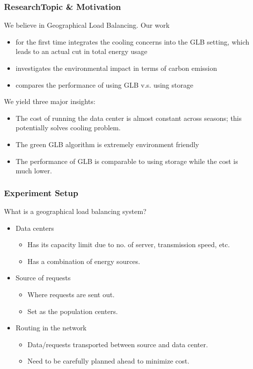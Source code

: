 \documentclass{beamer}
\begin{document}
%
%
\begin{frame}
\frametitle{ResearchTopic \& Motivation}
\begin{block}
{We believe in Geographical Load Balancing.}
Our work 
\begin{itemize}
\item
for the first time integrates the cooling concerns into the GLB setting, which leads to an actual cut in total energy usage
\item
investigates the environmental impact in terms of carbon emission
\item
compares the performance of using GLB v.s. using storage
\end{itemize}
We yield three major insights:
\begin{itemize}
\item
The cost of running the data center is almost constant across seasons; this potentially solves cooling problem.
\item
The green GLB algorithm is extremely environment friendly
\item
The performance of GLB is comparable to using storage while the cost is much lower.
\end{itemize}
\end{block}
\end{frame}
%
%
\begin{frame}
\frametitle{Experiment Setup}
\begin{block}
{What is a geographical load balancing system?}
\begin{itemize}
\item
Data centers
	\begin{itemize}
	\item
	Has its capacity limit due to no. of server, transmission speed, etc.
	\item
	Has a combination of energy sources.
	\end{itemize}
\item
Source of requests
	\begin{itemize}
	\item
	Where requests are sent out.
	\item
	Set as the population centers.
	\end{itemize}	
\item
Routing in the network
	\begin{itemize}
	\item
	Data/requests transported between source and data center.
	\item
	Need to be carefully planned ahead to minimize cost.
	\end{itemize}
\end{itemize}
\end{block}
\end{frame}
\end{document}
